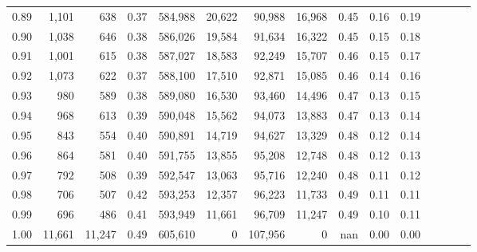 \begin{tabular}{rrrcrrrrrrrrrrr}
0.89 &   1,101 &     638 &                                       0.37 &  584,988 &   20,622 &   90,988 &   16,968 &  0.45 &  0.16 &                         0.19 \\
0.90 &   1,038 &     646 &                                       0.38 &  586,026 &   19,584 &   91,634 &   16,322 &  0.45 &  0.15 &                         0.18 \\
0.91 &   1,001 &     615 &                                       0.38 &  587,027 &   18,583 &   92,249 &   15,707 &  0.46 &  0.15 &                         0.17 \\
0.92 &   1,073 &     622 &                                       0.37 &  588,100 &   17,510 &   92,871 &   15,085 &  0.46 &  0.14 &                         0.16 \\
0.93 &     980 &     589 &                                       0.38 &  589,080 &   16,530 &   93,460 &   14,496 &  0.47 &  0.13 &                         0.15 \\
0.94 &     968 &     613 &                                       0.39 &  590,048 &   15,562 &   94,073 &   13,883 &  0.47 &  0.13 &                         0.14 \\
0.95 &     843 &     554 &                                       0.40 &  590,891 &   14,719 &   94,627 &   13,329 &  0.48 &  0.12 &                         0.14 \\
0.96 &     864 &     581 &                                       0.40 &  591,755 &   13,855 &   95,208 &   12,748 &  0.48 &  0.12 &                         0.13 \\
0.97 &     792 &     508 &                                       0.39 &  592,547 &   13,063 &   95,716 &   12,240 &  0.48 &  0.11 &                         0.12 \\
0.98 &     706 &     507 &                                       0.42 &  593,253 &   12,357 &   96,223 &   11,733 &  0.49 &  0.11 &                         0.11 \\
0.99 &     696 &     486 &                                       0.41 &  593,949 &   11,661 &   96,709 &   11,247 &  0.49 &  0.10 &                         0.11 \\
1.00 &  11,661 &  11,247 &                                       0.49 &  605,610 &        0 &  107,956 &        0 &   nan &  0.00 &                         0.00 \\
\bottomrule
\end{tabular}
